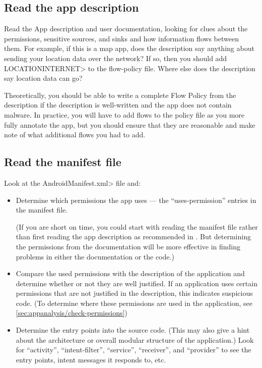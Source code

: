 \subsection{Read the app description}
\label{sec:read-the-app-description}

Read the App description and user documentation, looking for clues about
the permissions, sensitive sources, and sinks and how information
flows between them.  For example,
if this is a map app, does the description say anything about sending your location data over the
 network?  If so, then you should add \<LOCATION\flowsto INTERNET> to the flow-policy file.  Where
else does the description say location data can go?   

Theoretically, you should be able to write a complete Flow Policy from the
description if the description is well-written and the app does not contain
malware.  In practice, you will have to add flows to the policy file as you
more fully annotate the app, but you should ensure that they are reasonable
and make note of what additional flows you had to add.
 

\subsection{Read the manifest file}

Look at the \<AndroidManifest.xml> file and:
\begin{itemize}
\item Determine which permissions the app uses --- the ``uses-permission''
  entries in the manifest file.

  (If you are short on time, you could start with reading the manifest file
  rather than first reading the app description as recommended in
  .  But determining the permissions
  from the documentation will be more effective in finding problems in
  either the documentation or the code.)
\item Compare the used permissions with the description of the
  application and determine whether or not they are well justified.
  If an application uses certain permissions that are not justified
  in the description, this indicates suspicious code. 
  (To determine where these permissions are used in the application,
   see \ref{sec:appanalysis/check-permissions})


\item Determine the entry points into the source code. (This may also give
  a hint about the architecture or overall modular structure of the
  application.)
  Look for ``activity'', ``intent-filter'', ``service'', ``receiver'', and
  ``provider'' to see the entry points, intent messages it responds to,
  etc.

\end{itemize}



